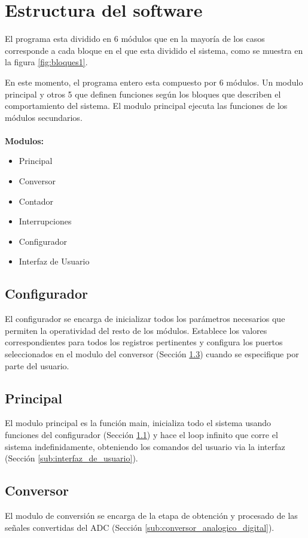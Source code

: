 
\section{Estructura del software} %
\label{sec:estructura_del_software}

El programa esta dividido en 6 módulos que en la mayoría de los casos corresponde a cada bloque en el que esta dividido el sistema, como se muestra en la figura \ref{fig:bloques1}.

En este momento, el programa entero esta compuesto por 6 módulos. Un modulo principal y otros 5 que definen funciones según los bloques que describen el comportamiento del sistema. El modulo principal ejecuta las funciones de los módulos secundarios.

\paragraph{}
\textbf{Modulos:}
\begin{itemize}
  \item Principal
  \item Conversor
  \item Contador
  \item Interrupciones
  \item Configurador
  \item Interfaz de Usuario
\end{itemize}

\subsection{Configurador}\label{sec:configuradorsw}
El configurador se encarga de inicializar todos los parámetros necesarios que permiten la operatividad del resto de los módulos. Establece los valores correspondientes para todos los registros pertinentes y configura los puertos seleccionados en el modulo del conversor (Sección \ref{sec:conversorsw}) cuando se especifique por parte del usuario.
\subsection{Principal}
El modulo principal es la función main, inicializa todo el sistema usando funciones del configurador (Sección \ref{sec:configuradorsw}) y hace el loop infinito que corre el sistema indefinidamente, obteniendo los comandos del usuario via la interfaz (Sección \ref{sub:interfaz_de_usuario}).

\subsection{Conversor}\label{sec:conversorsw}
El modulo de conversión se encarga de la etapa de obtención y procesado de las se\~nales convertidas del ADC (Sección \ref{sub:conversor_analogico_digital}).

